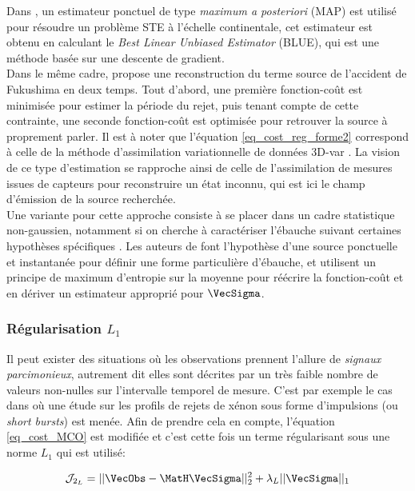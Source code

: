 Dans \cite{Winiarek2012}, un estimateur ponctuel de type \textit{maximum a posteriori} (MAP) est utilisé pour résoudre un problème STE à l'échelle continentale, cet estimateur est obtenu en calculant le \textit{Best Linear Unbiased Estimator} (BLUE), qui est une méthode basée sur une descente de gradient. \\

Dans le même cadre, \cite{Saunier2013} propose une reconstruction du terme source de l'accident de Fukushima en deux temps. Tout d'abord, une première fonction-coût est minimisée pour estimer la période du rejet, puis tenant compte de cette contrainte, une seconde fonction-coût est optimisée pour retrouver la source à proprement parler. 
Il est à noter que l'équation \eqref{eq_cost_reg_forme2} correspond à celle de la méthode d'assimilation variationnelle de données 3D-var \cite{Courtier1998}. La vision de ce type d'estimation se rapproche ainsi de celle de l'assimilation de mesures issues de capteurs pour reconstruire un état inconnu, qui est ici le champ d'émission de la source recherchée.\\

Une variante pour cette approche consiste à se placer dans un cadre statistique non-gaussien, notamment si on cherche à caractériser l'ébauche suivant certaines hypothèses spécifiques \cite{Bocquet2005a}. Les auteurs de \cite{Krysta2007} font l'hypothèse d'une source ponctuelle et instantanée pour définir une forme particulière d'ébauche, et utilisent un principe de maximum d'entropie sur la moyenne \cite{Jaynes1957} pour réécrire la fonction-coût et en dériver un estimateur approprié pour $\VecSigma$.\\

\subsubsection{Régularisation $L_1$}

Il peut exister des situations où les observations prennent l'allure de \textit{signaux parcimonieux}, autrement dit elles sont décrites par un très faible nombre de valeurs non-nulles sur l'intervalle temporel de mesure. C'est par exemple le cas dans \cite{Martinez2013} où une étude sur les profils de rejets de xénon sous forme d'impulsions (ou \textit{short bursts}) est menée. Afin de prendre cela en compte, l'équation \eqref{eq_cost_MCO} est modifiée et c'est cette fois un terme régularisant sous une norme $L_1$ qui est utilisé: 

\begin{equation}
\mathcal{J}_{2_L} = ||\VecObs - \MatH\VecSigma||_2^2 + \lambda_L ||\VecSigma||_1
\label{eq_MCO_L1}
\end{equation}


